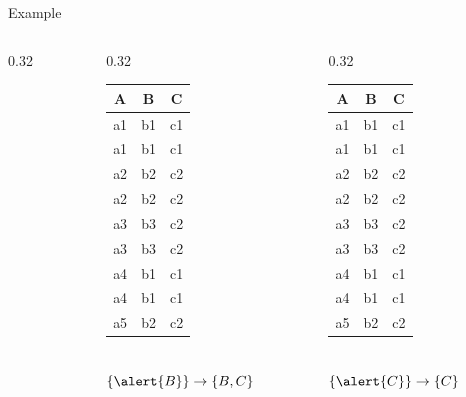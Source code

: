 \documentclass{beamer}
\begin{document}
\begin{frame}{Example}
\begin{columns}
\begin{column}{0.32\textwidth}
    \end{column}
    \pause
    \begin{column}{0.32\textwidth}
        \begin{table}[t]
\centering
\begin{tabular}{ccc}
\toprule
\textbf{A} & \textbf{\alert{B}} & \textbf{C} \\
\toprule
\rowcolor{Dandelion}
a1 & b1 & c1 \\
\rowcolor{Dandelion}
a1 & b1 & c1 \\
\rowcolor{lightgray}
a2 & b2 & c2 \\
\rowcolor{lightgray}
a2 & b2 & c2 \\
\rowcolor{Thistle}
a3 & b3 & c2 \\
\rowcolor{Thistle}
a3 & b3 & c2 \\
\rowcolor{Dandelion}
a4 & b1 & c1 \\
\rowcolor{Dandelion}
a4 & b1 & c1 \\
\rowcolor{lightgray}
a5 & b2 & c2 \\
\bottomrule
\end{tabular}\\
\pause
$\{\alert{B}\} \rightarrow \{B,C\}$
\end{table}
    \end{column}
    \pause
    \begin{column}{0.32\textwidth}
        \begin{table}[t]
\centering
\begin{tabular}{ccc}
\toprule
\textbf{A} & \textbf{B} & \textbf{\alert{C}} \\
\toprule
\rowcolor{Dandelion}
a1 & b1 & c1 \\
\rowcolor{Dandelion}
a1 & b1 & c1 \\
\rowcolor{lightgray}
a2 & b2 & c2 \\
\rowcolor{lightgray}
a2 & b2 & c2 \\
\rowcolor{lightgray}
a3 & b3 & c2 \\
\rowcolor{lightgray}
a3 & b3 & c2 \\
\rowcolor{Dandelion}
a4 & b1 & c1 \\
\rowcolor{Dandelion}
a4 & b1 & c1 \\
\rowcolor{lightgray}
a5 & b2 & c2 \\
\bottomrule
\end{tabular}\\
\pause
$\{\alert{C}\} \rightarrow \{C\}$
\end{table}
    \end{column}
\end{columns}
\end{frame}
\end{document}
